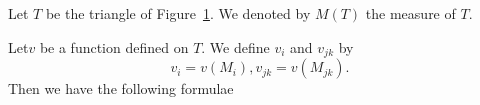 Let $T$ be the triangle of Figure~\ref{c2:fig7.1}. We denoted by $M (T)$ the
measure of $T$.  

\setcounter{figure}{0}
\begin{figure}[H]
  \caption{}\label{c2:fig7.1}
\end{figure}


Let\pageoriginale $v$ be a function defined on $T$. We define $v_i$ and $v_{jk}$ by  
$$
v_i = v(M_i), v_{jk} = v(M_{jk}).
$$
Then we have the following formulae


